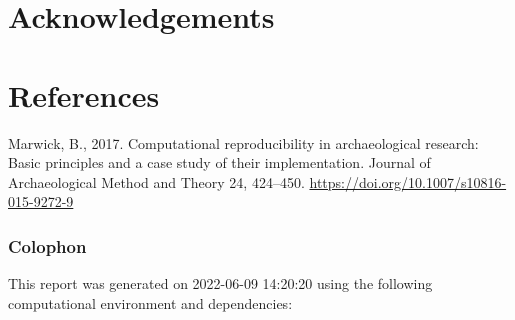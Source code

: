 \documentclass[
]{article}
\newlength{\cslhangindent}
\newlength{\cslentryspacingunit} %
\newenvironment{CSLReferences}[2] %
 {%
  \setlength{\parindent}{0pt}
  \ifodd #1
  \let\oldpar\par
  \def\par{\hangindent=\cslhangindent\oldpar}
  \fi
  \setlength{\parskip}{#2\cslentryspacingunit}
 }%
 {}
\begin{document}
\hypertarget{acknowledgements}{%
\section{Acknowledgements}\label{acknowledgements}}

\newpage

\hypertarget{references}{%
\section{References}\label{references}}

\hypertarget{refs}{}
\begin{CSLReferences}{1}{0}
\leavevmode{}%
Marwick, B., 2017. Computational reproducibility in archaeological research: Basic principles and a case study of their implementation. Journal of Archaeological Method and Theory 24, 424--450. \url{https://doi.org/10.1007/s10816-015-9272-9}

\end{CSLReferences}

\newpage

\hypertarget{colophon}{%
\subsubsection{Colophon}\label{colophon}}

This report was generated on 2022-06-09 14:20:20 using the following computational environment and dependencies:
\end{document}
